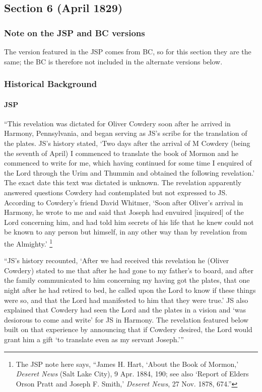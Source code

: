 \subsection{Section 6 (April 1829)}
	\label{DC6}
	
	\subsubsection{Note on the JSP and BC versions}
	
		The version featured in the JSP comes from BC, so for this section they are the same; the BC is therefore not included in the alternate versions below.
	
	\subsubsection{Historical Background}
		\label{DC6-HB}
		
		\paragraph{JSP}
		
			``This revelation was dictated for Oliver Cowdery soon after he arrived in Harmony, Pennsylvania, and began serving as JS's scribe for the translation of the plates. JS's history stated, `Two days after the arrival of M Cowdery (being the seventh of April) I commenced to translate the book of Mormon and he commenced to write for me, which having continued for some time I enquired of the Lord through the Urim and Thummin and obtained the following revelation.' The exact date this text was dictated is unknown. The revelation apparently answered questions Cowdery had contemplated but not expressed to JS. According to Cowdery's friend David Whitmer, `Soon after Oliver's arrival in Harmony, he wrote to me and said that Joseph had envuired [inquired] of the Lord concerning him, and had told him secrets of his life that he knew could not be known to any person but himself, in any other way than by revelation from the Almighty.'%
				\footnote{%
					The JSP note here says, ``James H. Hart, `About the Book of Mormon,' \textit{Deseret News} (Salt Lake City), 9 Apr. 1884, 190; see also `Report of Elders Orson Pratt and Joseph F. Smith,' \textit{Deseret News}, 27 Nov. 1878, 674.''
					}
			
			``JS's history recounted, `After we had received this revelation he (Oliver Cowdery) stated to me that after he had gone to my father's to board, and after the family communicated to him concerning my having got the plates, that one night after he had retired to bed, he called upon the Lord to know if these things were so, and that the Lord had manifested to him that they were true.' JS also explained that Cowdery had seen the Lord and the plates in a vision and `was desiorous to come and write' for JS in Harmony. The revelation featured below built on that experience by announcing that if Cowdery desired, the Lord would grant him a gift `to translate even as my servant Joseph.'''
		
